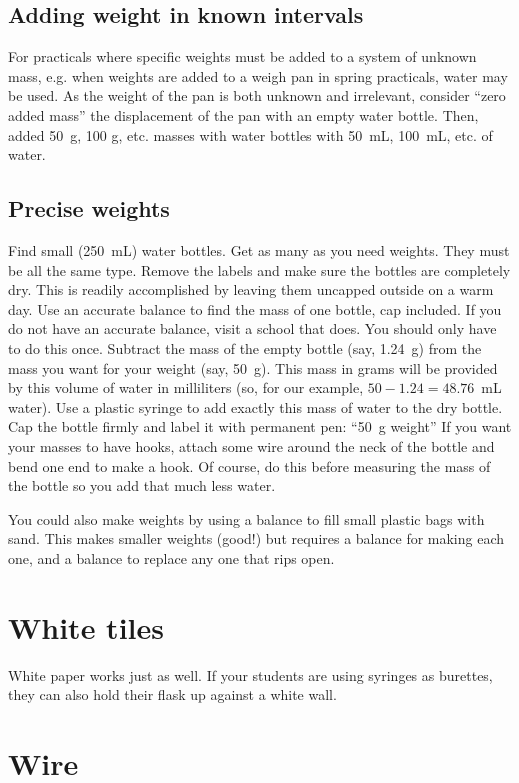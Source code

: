 \subsection{Adding weight in known intervals}
For practicals where specific weights must be added 
to a system of unknown mass, 
e.g. 
when weights are added to a weigh pan in spring practicals, 
water may be used. 
As the weight of the pan is both unknown and irrelevant, 
consider ``zero added mass'' the displacement of the pan with an empty water bottle. 
Then, 
added 50~g, 
100 g, 
etc. masses with water bottles with 50~mL, 
100~mL, 
etc. of water.

\subsection{Precise weights}
Find small (250~mL) water bottles. 
Get as many as you need weights. 
They must be all the same type.
Remove the labels and make sure the bottles are completely dry. 
This is readily accomplished 
by leaving them uncapped outside on a warm day.
Use an accurate balance to find the mass of one bottle, 
cap included. 
If you do not have an accurate balance, 
visit a school that does. 
You should only have to do this once.
Subtract the mass of the empty bottle (say, 
1.24~g) from the mass you want for your weight (say, 
50~g). 
This mass in grams will be provided 
by this volume of water in milliliters (so, 
for our example, 
$ 50 - 1.24 = 48.76 $~mL water). 
Use a plastic syringe to add exactly this mass of water to the dry bottle.
Cap the bottle firmly and label it with permanent pen: ``50~g weight'' 
If you want your masses to have hooks, 
attach some wire around the neck of the bottle 
and bend one end to make a hook. 
Of course, 
do this before measuring the mass of the bottle so you add that much less water.

You could also make weights by using a balance 
to fill small plastic bags with sand. 
This makes smaller weights (good!) 
but requires a balance for making each one, 
and a balance to replace any one that rips open.

\section{White tiles}
\label{sec:white-tiles}
White paper works just as well. 
If your students are using syringes as burettes, 
they can also hold their flask up against a white wall.

\section{Wire}
\label{sec:wire}

